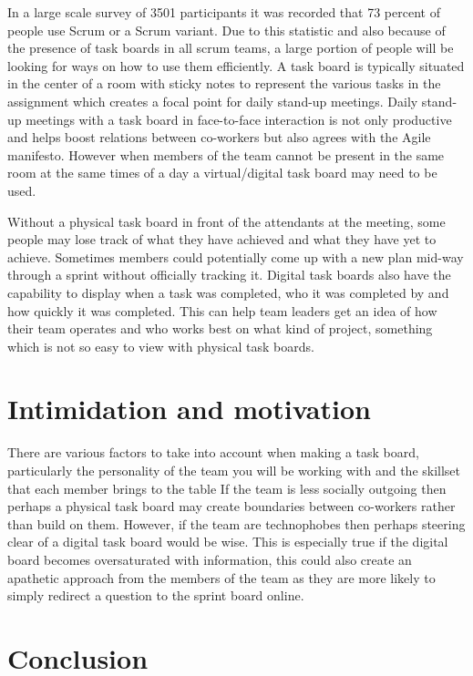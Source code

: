 \documentclass{scrartcl}
\begin{document}
In a large scale survey of 3501 participants it was recorded that 73 percent of people use Scrum or a Scrum variant. Due to this statistic and also because of the presence of task boards in all scrum teams\cite{dullemond2014collaboration}, a large portion of people will be looking for ways on how to use them efficiently. A task board is typically situated in the center of a room with sticky notes to represent the various tasks in the assignment which creates a focal point for daily stand-up meetings. Daily stand-up meetings with a task board in face-to-face interaction is not only productive and helps boost relations between co-workers but also agrees with the Agile manifesto\cite{rubart:2014cooperative}. However when members of the team cannot be present in the same room at the same times of a day a virtual/digital task board may need to be used. 


Without a physical task board in front of the attendants at the meeting, some people may lose track of what they have achieved and what they have yet to achieve. Sometimes members could potentially come up with a new plan mid-way through a sprint without officially tracking it.
Digital task boards also have the capability to display when a task was completed, who it was completed by and how quickly it was completed. This can help team leaders get an idea of how their team operates and who works best on what kind of project, something which is not so easy to view with physical task boards.\cite{hajratwala2012task}

\section{Intimidation and motivation}

There are various factors to take into account when making a task board, particularly the personality of the team you will be working with and the skillset that each member brings to the table
If the team is less socially outgoing then perhaps a physical task board may create boundaries between co-workers rather than build on them. However, if the team are technophobes then perhaps steering clear of a digital task board would be wise. 
This is especially true if the digital board becomes oversaturated with information, this could also create an apathetic approach from the members of the team as they are more likely to simply redirect a question to the sprint board online.\cite{perry2008drifting}

\section{Conclusion}
\end{document}
